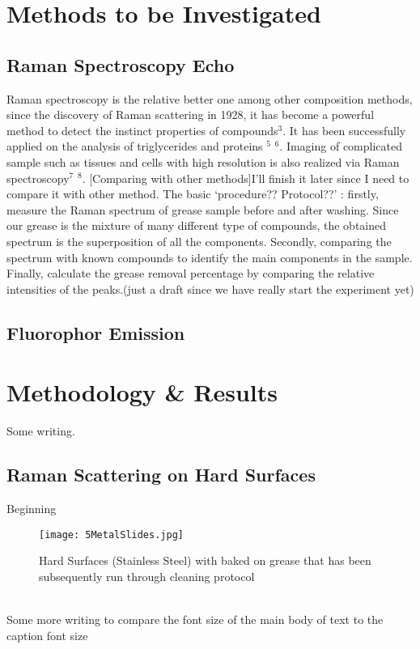 \documentclass[a4paper ,12pt]{article}
\begin{document}
\section{Methods to be Investigated}
\subsection{Raman Spectroscopy Echo}
Raman spectroscopy is the relative better one among other composition methods, since the discovery of Raman scattering in 1928, it has become a powerful method to detect the instinct properties of compounds$^3$. It has been successfully applied on the analysis of triglycerides and proteins $^5$ $^6$. Imaging of complicated sample such as tissues and cells with high resolution is also realized via Raman spectroscopy$^7$ $^8$.  
[Comparing with other methods]I’ll finish it later since I need to compare it with other method.
The basic ‘procedure?? Protocol??’ : firstly, measure the Raman spectrum of grease sample before and after washing. Since our grease is the mixture of many different type of compounds, the obtained spectrum is the superposition of all the components. Secondly, comparing the spectrum with known compounds to identify the main components in the sample. Finally, calculate the grease removal percentage by comparing the relative intensities of the peaks.(just a draft since we have really start the experiment yet)

\subsection{Fluorophor Emission}
\newpage

\section{Methodology \& Results}
Some writing.\\
\subsection{Raman Scattering on Hard Surfaces}
Beginning\\
\begin{figure}[h]
\centering
\texttt{[image: 5MetalSlides.jpg]}
\caption[\small Figure 1.]{\small{Hard Surfaces (Stainless Steel) with baked on grease that has been subsequently run through cleaning protocol}}
\end{figure}
\\Some more writing to compare the font size of the main body of text to the caption font size
\end{document}
